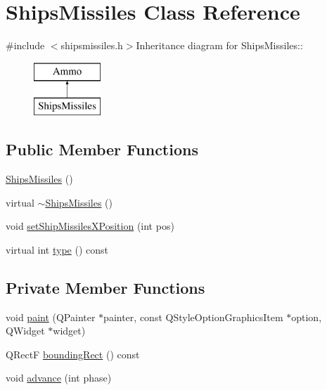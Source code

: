 \hypertarget{class_ships_missiles}{
\section{ShipsMissiles Class Reference}
\label{class_ships_missiles}
}


{\ttfamily \#include $<$shipsmissiles.h$>$}Inheritance diagram for ShipsMissiles::\begin{figure}[H]
\begin{center}
\leavevmode
\includegraphics[height=2cm]{class_ships_missiles}
\end{center}
\end{figure}
\subsection*{Public Member Functions}
\begin{DoxyCompactItemize}
\item 
\hyperlink{class_ships_missiles_ae2a320ddf054587cd0ebcb64267e0294}{ShipsMissiles} ()
\item 
virtual \hyperlink{class_ships_missiles_aff6a5eeef72231cedebb37c1f90e7e36}{$\sim$ShipsMissiles} ()
\item 
void \hyperlink{class_ships_missiles_a9a88fe4620fbe0e6cedc6f16188936d1}{setShipMissilesXPosition} (int pos)
\item 
virtual int \hyperlink{class_ships_missiles_afe6d8431cee08b306942285f35842eea}{type} () const 
\end{DoxyCompactItemize}
\subsection*{Private Member Functions}
\begin{DoxyCompactItemize}
\item 
void \hyperlink{class_ships_missiles_a709bf076bb74b37149907c06ffae942e}{paint} (QPainter $\ast$painter, const QStyleOptionGraphicsItem $\ast$option, QWidget $\ast$widget)
\item 
QRectF \hyperlink{class_ships_missiles_a0f26573f2bf4eed4c4320d09b1384c49}{boundingRect} () const 
\item 
void \hyperlink{class_ships_missiles_a5ce92a82b6f1259319e92379ab4ee306}{advance} (int phase)
\end{DoxyCompactItemize}
